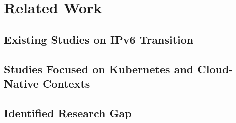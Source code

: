 \chapter{Related Work}

\section{Existing Studies on IPv6 Transition}

\section{Studies Focused on Kubernetes and Cloud-Native Contexts}

\section{Identified Research Gap}